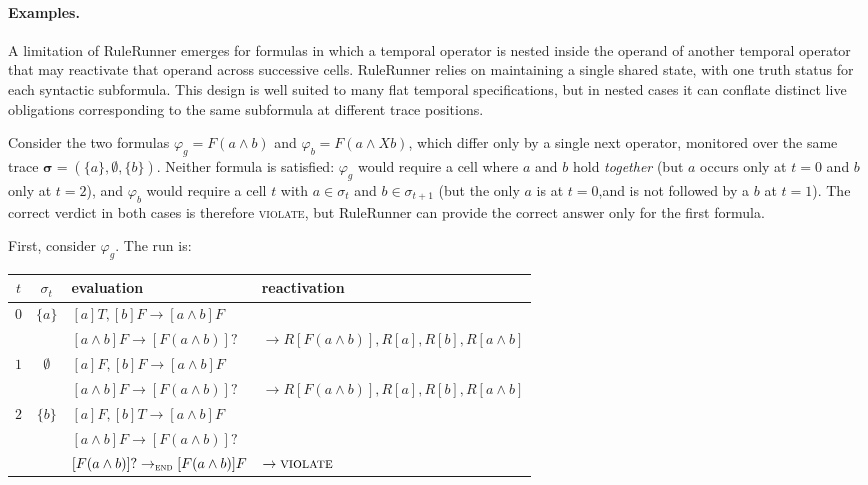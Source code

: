 \paragraph{Examples.}
A limitation of RuleRunner emerges for formulas in which a temporal operator is nested inside the operand of another temporal operator that may reactivate that operand across successive cells. RuleRunner relies on maintaining a single shared state, with one truth status for each syntactic subformula. This design is well suited to many flat temporal specifications, but in nested cases it can conflate distinct live obligations corresponding to the same subformula at different trace positions. 

Consider the two formulas $\varphi_g = F(a \land b)$ and $\varphi_b = F(a \land Xb)$, which differ only by a single next operator, monitored over the same trace $\boldsymbol{\sigma} = (\{a\}, \emptyset, \{b\})$. Neither formula is satisfied: $\varphi_g$ would require a cell where $a$ and $b$ hold \emph{together} (but $a$ occurs only at $t = 0$ and $b$ only at $t = 2$), and $\varphi_b$ would require a cell $t$ with $a \in \sigma_t$ and $b \in \sigma_{t+1}$ (but the only $a$ is at $t = 0$,and is not followed by a $b$ at $t = 1$). The correct verdict in both cases is therefore \textsc{violate}, but RuleRunner can provide the correct answer only for the first formula.  

First, consider $\varphi_g$. The run is:
%
\noindent
\begin{center}\small
\begin{tabular}{c c l l}
\toprule
$t$ & $\sigma_t$ & evaluation & reactivation\\
\midrule
\multirow{2}{*}{$0$} & \multirow{2}{*}{$\{a\}$} & $[a]T,[b]F \rightarrow [a \land b]F$ & \\
& & $[a \land b]F \rightarrow [F(a \land b)]?$ & $\rightarrow R[F(a \land b)],R[a],R[b],R[a \land b]$\\[1.5ex]
\multirow{2}{*}{$1$} & \multirow{2}{*}{$\emptyset$} & $[a]F,[b]F \rightarrow [a \land b]F$ & \\
& & $[a \land b]F \rightarrow [F(a \land b)]?$ & $\rightarrow R[F(a \land b)],R[a],R[b],R[a \land b]$\\[1.5ex]
\multirow{3}{*}{$2$} & \multirow{3}{*}{$\{b\}$} & $[a]F,[b]T \rightarrow [a \land b]F$ & \\
& & $[a \land b]F \rightarrow [F(a \land b)]?$ & \\
& & $[F(a \land b)]? \rightarrow_{\textsc{end}} [F(a \land b)]F$ & $\rightarrow \textsc{violate}$ \\
\bottomrule
\end{tabular}
\end{center}

